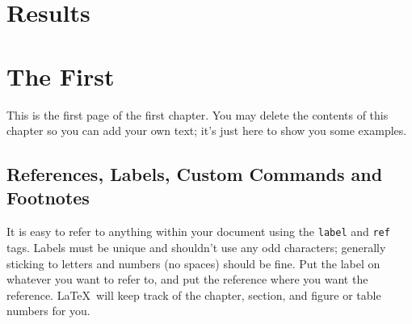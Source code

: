 \documentclass[12pt,twoside]{reedthesis}
\theoremstyle{plain}   %
\theoremstyle{definition}
\theoremstyle{remark}
\numberwithin{equation}{section}
\begin{document}
  \chapter{Results}

















   









































































        
    \chapter{The First}
    	This is the first page of the first chapter. You may delete the contents of this chapter so you can add your own text; it's just here to show you some examples. 
	
\section{References, Labels, Custom Commands and Footnotes}
It is easy to refer to anything within your document using the \texttt{label} and \texttt{ref} tags.  Labels must be unique and shouldn't use any odd characters; generally sticking to letters and numbers (no spaces) should be fine. Put the label on whatever you want to refer to, and put the reference where you want the reference. \LaTeX\ will keep track of the chapter, section, and figure or table numbers for you. 
\end{document}
